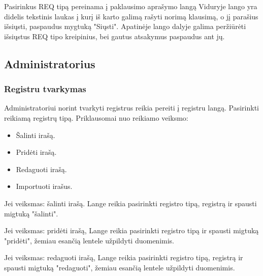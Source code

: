 	
	Pasirinkus REQ tipą pereinama į paklausimo aprašymo langą 
	Viduryje lango yra didelis tekstinis laukas į kurį iš karto galimą rašyti norimą klausimą, o jį parašius išsiųsti, paspaudus mygtuką "Siųsti".
	Apatinėje lango dalyje galima peržiūrėti išsiųstus REQ tipo kreipinius, bei gautus atsakymus paspaudus ant jų.
	

\subsection{Administratorius}

	\subsubsection{Registru tvarkymas}
	
	Administratoriui norint tvarkyti registrus reikia pereiti į registru langą. Pasirinkti reikiamą registrų tipą. 
	Priklausomai nuo reikiamo veiksmo:
	
	\begin{itemize}
		\item Šalinti irašą.
		\item Pridėti irašą.
		\item Redaguoti irašą.
		\item Importuoti irašus.
	\end{itemize}
	
	
	Jei veiksmas: šalinti irašą. Lange  reikia pasirinkti registro tipą, registrą ir spausti migtuką "šalinti".

	Jei veiksmas: pridėti irašą, Lange  reikia pasirinkti registro tipą ir spausti migtuką "pridėti", žemiau esančią lentele užpildyti duomenimis.

	Jei veiksmas: redaguoti irašą, Lange  reikia pasirinkti registro tipą, registrą ir spausti migtuką "redaguoti", žemiau esančią lentele užpildyti duomenimis.
	
	